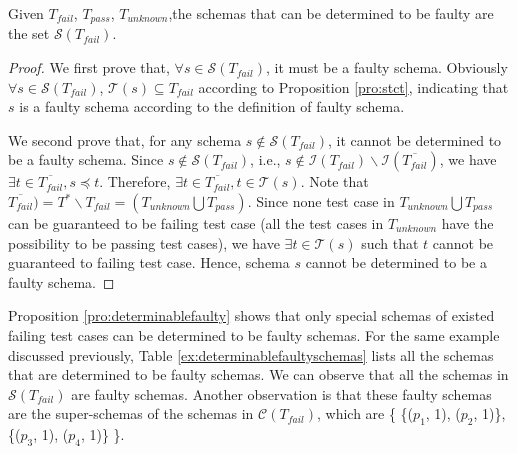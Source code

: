 \begin{proposition}\label{pro:determinablefaulty}
Given  $T_{fail}$, $T_{pass}$, $T_{unknown}$,the schemas that can be determined to be faulty are the set $\mathcal{S}(T_{fail})$.
\end{proposition}

\begin{proof}
We first prove that, $\forall s \in \mathcal{S}(T_{fail})$, it must be a faulty schema.
Obviously $\forall s \in \mathcal{S}(T_{fail})$, $\mathcal{T}(s) \subseteq T_{fail}$ according to Proposition \ref{pro:stct}, indicating that $s$ is a faulty schema according to the definition of faulty schema.

We second prove that, for any schema $s \not\in \mathcal{S}(T_{fail})$, it cannot be determined to be a faulty schema. Since $s \not\in \mathcal{S}(T_{fail})$, i.e., $s \not\in \mathcal{I}(T_{fail})\backslash \mathcal{I}(\overline{T_{fail}})$, we have $\exists t \in \overline{T_{fail}}, s \preceq t$. Therefore,  $\exists t \in \overline{T_{fail}}, t \in \mathcal{T}(s)$. Note that $\overline{T_{fail}}) = T^{*} \backslash T_{fail} =  (T_{unknown} \bigcup T_{pass})$. Since none test case in $T_{unknown} \bigcup T_{pass}$ can be guaranteed to be failing test case (all the test cases in $T_{unknown}$ have the possibility to be passing test cases), we have $\exists t \in \mathcal{T}(s)$ such that $t$ cannot be guaranteed to failing test case.  Hence, schema $s$ cannot be determined to be a faulty schema.
\end{proof}

Proposition \ref{pro:determinablefaulty} shows that only special schemas of existed failing test cases can be determined to be faulty schemas.  For the same example discussed previously, Table \ref{ex:determinablefaultyschemas} lists all the schemas that are determined to be faulty schemas.
We can observe that all the schemas in $\mathcal{S}(T_{fail})$ are faulty schemas. Another observation is that these faulty schemas are the super-schemas of the schemas in $\mathcal{C}(T_{fail})$, which are \{ \{($p_{1}$, 1), ($p_{2}$, 1)\}, \{($p_{3}$, 1), ($p_{4}$, 1)\} \}.


